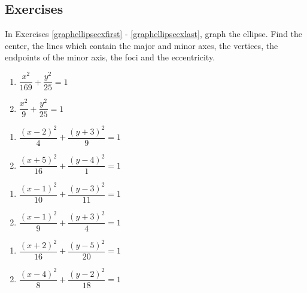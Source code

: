 \newpage

\subsection{Exercises}

In Exercises \ref{graphellipseexfirst} - \ref{graphellipseexlast},  graph the ellipse.  Find the center, the lines which contain the major and minor axes, the vertices, the endpoints of the minor axis, the foci and the eccentricity.

\begin{multicols}{2}
\begin{enumerate}

\item $\dfrac{x^{2}}{169} + \dfrac{y^{2}}{25} = 1$  \label{graphellipseexfirst}
\item $\dfrac{x^2}{9} + \dfrac{y^2}{25} = 1$



\setcounter{HW}{\value{enumi}}
\end{enumerate}
\end{multicols}

\begin{multicols}{2}
\begin{enumerate}
\setcounter{enumi}{\value{HW}}

\item $\dfrac{(x - 2)^{2}}{4} + \dfrac{(y + 3)^{2}}{9} = 1$
\item $\dfrac{(x + 5)^{2}}{16} + \dfrac{(y - 4)^{2}}{1} = 1$


\setcounter{HW}{\value{enumi}}
\end{enumerate}
\end{multicols}

\begin{multicols}{2}
\begin{enumerate}
\setcounter{enumi}{\value{HW}}

\item $\dfrac{(x - 1)^{2}}{10} + \dfrac{(y - 3)^{2}}{11} = 1$
\item $\dfrac{(x-1)^2}{9}+\dfrac{(y+3)^2}{4} = 1$


\setcounter{HW}{\value{enumi}}
\end{enumerate}
\end{multicols}

\begin{multicols}{2}
\begin{enumerate}
\setcounter{enumi}{\value{HW}}

\item $\dfrac{(x+2)^2}{16}+\dfrac{(y-5)^2}{20} = 1$
\item $\dfrac{(x-4)^2}{8} + \dfrac{(y-2)^2}{18} = 1$ \label{graphellipseexlast}

\setcounter{HW}{\value{enumi}}
\end{enumerate}
\end{multicols}

